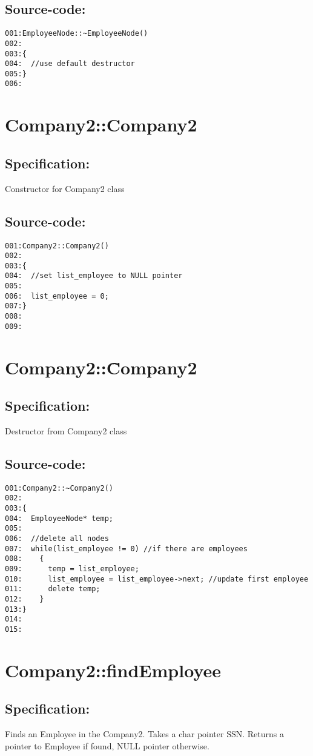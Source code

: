 \subsection*{Source-code:}
\begin{verbatim}
001:EmployeeNode::~EmployeeNode()
002:     
003:{
004:  //use default destructor
005:}
006:
\end{verbatim}
\section{Company2::Company2}
\subsection*{Specification:}
Constructor for Company2 class
\subsection*{Source-code:}
\begin{verbatim}
001:Company2::Company2()
002:
003:{
004:  //set list_employee to NULL pointer
005:
006:  list_employee = 0;  
007:}
008:
009:
\end{verbatim}
\section{Company2::\~Company2}
\subsection*{Specification:}
Destructor from Company2 class
\subsection*{Source-code:}
\begin{verbatim}
001:Company2::~Company2()
002:
003:{ 
004:  EmployeeNode* temp;       
005:
006:  //delete all nodes
007:  while(list_employee != 0) //if there are employees
008:    {
009:      temp = list_employee;
010:      list_employee = list_employee->next; //update first employee
011:      delete temp;     
012:    }
013:}
014:
015:
\end{verbatim}
\section{Company2::findEmployee}
\subsection*{Specification:}
Finds an Employee in the Company2.
   Takes a char pointer SSN.
   Returns a pointer to Employee if found, NULL pointer otherwise.
